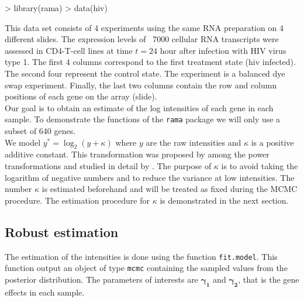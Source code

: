 \documentclass[11pt]{article}
\begin{document}
\begin{Schunk}
\begin{Sinput}
> library(rama)
> data(hiv)
\end{Sinput}
\end{Schunk}

 
This data set consists of 4 experiments using the same RNA preparation on 4 
different slides. The expression levels of ~7000 cellular RNA transcripts were assessed
in CD4-T-cell lines at time $t=24$ hour after infection with HIV virus
type 1. The first 4 columns correspond to the first treatment state (hiv
infected). The second four represent the control state. The experiment
is a balanced dye swap experiment. Finally, the last two columns
  contain the row and column positions of each gene on the array (slide). \\

Our goal is to obtain an estimate of the log intensities of each gene in each sample. 
To demonstrate the functions of the {\tt rama} package we will only use a subset of 640 genes. \\

We model $y^*=\log_2(y+\kappa)$ where $y$ are the raw intensities and $\kappa$ is a positive additive constant. 
This transformation was proposed by  among the power transformations and studied in detail by 
. 
The purpose of $\kappa$ is to avoid taking the logarithm of negative numbers and to reduce the variance at low intensities. 
The number $\kappa$ is estimated beforehand and will be treated as fixed during the MCMC procedure. The estimation procedure for 
$\kappa$ is demonstrated in the next section. 

\subsection{Robust estimation}
The estimation of the intensities is done using the function {\tt fit.model}.
This function output an object of type {\tt mcmc} containing the sampled values from the
posterior distribution. The parameters of interests are $\boldsymbol{\gamma_1}$ and 
$\boldsymbol{\gamma_2}$, that is the gene effects in each sample. \\
\end{document}
